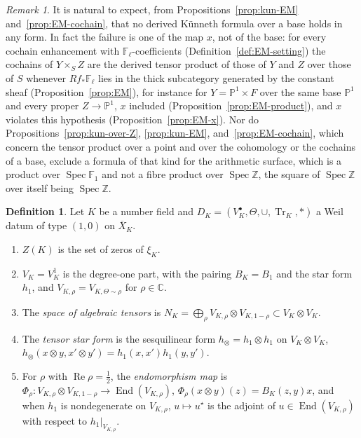 \documentclass[11pt]{amsart}
\theoremstyle{plain}
\theoremstyle{definition}
\newtheorem{definition}[theorem]{Definition}
\theoremstyle{remark}
\newtheorem{remark}[theorem]{Remark}
\numberwithin{equation}{section}
\newcommand{\C}{\mathbb{C}}
\newcommand{\Z}{\mathbb{Z}}
\newcommand{\F}{\mathbb{F}}
\newcommand{\Xbar}{\overline{X}}
\DeclareMathOperator{\Tr}{Tr}
\DeclareMathOperator{\Spec}{Spec}
\DeclareMathOperator{\Rea}{Re}
\renewcommand{\Re}{\Rea}
\begin{document}
\begin{remark}\label{rem:N-EM-scope}
It is natural to expect, from Propositions~\ref{prop:kun-EM}
and~\ref{prop:EM-cochain}, that no derived K\"unneth formula over a base
holds in any form. In fact the failure is one of the map $x$, not of
the base: for every cochain enhancement with $\F_\ell$-coefficients
(Definition~\ref{def:EM-setting}) the cochains of $Y\times_SZ$ are
the derived tensor product of those of $Y$ and $Z$ over those of $S$
whenever $Rf_*\F_\ell$ lies in the thick subcategory generated by the
constant sheaf (Proposition~\ref{prop:EM}), for instance for
$Y=\mathbb{P}^1\times F$ over the same base $\mathbb{P}^1$ and every
proper $Z\to\mathbb{P}^1$, $x$ included
(Proposition~\ref{prop:EM-product}), and $x$ violates this hypothesis
(Proposition~\ref{prop:EM-x}). Nor do
Propositions~\ref{prop:kun-over-Z}, \ref{prop:kun-EM},
and~\ref{prop:EM-cochain}, which concern the tensor product over a
point and over the cohomology or the cochains of a base, exclude a
formula of that kind for the arithmetic surface, which is a product
over $\Spec\F_1$ and not a fibre product over $\Spec\Z$, the square of
$\Spec\Z$ over itself being $\Spec\Z$.
\end{remark}

\begin{definition}\label{def:kun-notation}
Let $K$ be a number field and $D_K=(V_K^\bullet,\Theta,\cup,\Tr_K,*)$ a
Weil datum of type $(1,0)$ on $\Xbar_K$.
\begin{enumerate}[label=(\alph*)]
\item $Z(K)$ is the set of zeros of $\xi_K$.
\item $V_K=V_K^1$ is the degree-one part, with the pairing
  $B_K=B_1$ and the star form $h_1$, and $V_{K,\rho}=
  V_{K,\Theta\sim\rho}$ for $\rho\in\C$.
\item The \emph{space of algebraic tensors} is $N_K=\bigoplus_\rho
  V_{K,\rho}\otimes V_{K,1-\rho}\subset V_K\otimes V_K$.
\item The \emph{tensor star form} is the sesquilinear form
  $h_\otimes=h_1\otimes h_1$ on $V_K\otimes V_K$, $h_\otimes(x\otimes
  y,x'\otimes y')=h_1(x,x')h_1(y,y')$.
\item For $\rho$ with $\Re\rho=\tfrac12$, the \emph{endomorphism map}
  is $\Phi_\rho:V_{K,\rho}\otimes V_{K,1-\rho}\to
  \operatorname{End}(V_{K,\rho})$, $\Phi_\rho(x\otimes y)(z)=
  B_K(z,y)x$, and when $h_1$ is nondegenerate on $V_{K,\rho}$,
  $u\mapsto u^\star$ is the adjoint of $u\in\operatorname{End}
  (V_{K,\rho})$ with respect to $h_1|_{V_{K,\rho}}$.
\end{enumerate}
\end{definition}
\end{document}
